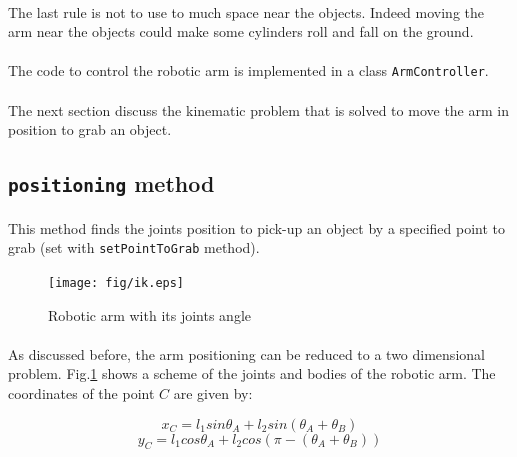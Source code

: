\documentclass[12pt,a4paper]{article}
\begin{document}
\paragraph{} The last rule is not to use to much space near the objects. Indeed moving the arm near the objects could make some cylinders roll and fall on the ground.

\paragraph{} The code to control the robotic arm is implemented in a class \texttt{ArmController}.

\paragraph{} The next section discuss the kinematic problem that is solved to move the arm in position to grab an object.

\subsection{\texttt{positioning} method}
\paragraph{} This method finds the joints position to pick-up an object by a specified point to grab (set with \texttt{setPointToGrab} method).


\begin{figure}[!htbp]
  \centering
  \texttt{[image: fig/ik.eps]}
  \caption{Robotic arm with its joints angle}
  \label{fig:ik}
\end{figure}

\paragraph{} As discussed before, the arm positioning can be reduced to a two dimensional problem. Fig.\ref{fig:ik} shows a scheme of the joints and bodies of the robotic arm. The coordinates of the point $C$ are given by:

\begin{equation}
  x_C = l_1sin\theta_A+l_2sin(\theta_A+\theta_B)\label{eq:xc}
\end{equation}
\begin{equation}
  y_C = l_1cos\theta_A+l_2cos(\pi-(\theta_A+\theta_B))\label{eq:yc}
\end{equation}
\end{document}
